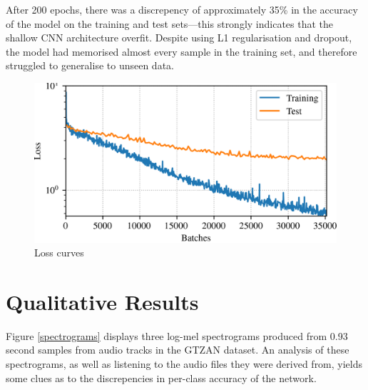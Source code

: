 \documentclass[conference]{IEEEtran}
\begin{document}
After 200 epochs, there was a discrepency of approximately 35\% in the accuracy of the model on the training and test sets---this strongly indicates that the shallow CNN architecture overfit.
Despite using L1 regularisation and dropout, the model had memorised almost every sample in the training set, and therefore struggled to generalise to unseen data.

\begin{figure}[htbp]
    \centerline{\includegraphics[width=\columnwidth]{loss.png}}
    \caption{Loss curves}
    \label{loss_curves}
\end{figure}

\section{Qualitative Results}

Figure \ref{spectrograms} displays three log-mel spectrograms produced from 0.93 second samples from audio tracks in the GTZAN dataset.
An analysis of these spectrograms, as well as listening to the audio files they were derived from, yields some clues as to the discrepencies in per-class accuracy of the network.
\end{document}
